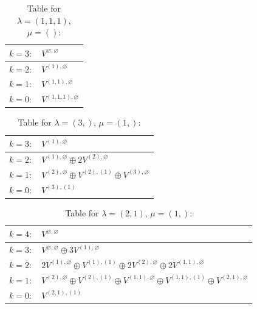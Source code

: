\documentclass[a4paper,12pt]{article}
\begin{document}
\renewcommand{\arraystretch}{1.6} 
\begin{table}[H]
\centering
\caption{Table for $\lambda = (1, 1, 1)$, $\mu = ()$:}
\begin{tabular}{|>{\centering\arraybackslash}p{15cm}|}
\hline
 $k = 3: \quad V^{\varnothing, \varnothing} $ \\ \hline
 $k = 2: \quad V^{(1), \varnothing} $ \\ \hline
 $k = 1: \quad V^{(1, 1), \varnothing} $ \\ \hline
 $k = 0: \quad V^{(1, 1, 1), \varnothing} $ \\ \hline
\end{tabular}
\end{table}

\renewcommand{\arraystretch}{1.6} 
\begin{table}[H]
\centering
\caption{Table for $\lambda = (3,)$, $\mu = (1,)$:}
\begin{tabular}{|>{\centering\arraybackslash}p{15cm}|}
\hline
 $k = 3: \quad V^{(1), \varnothing} $ \\ \hline
 $k = 2: \quad V^{(1), \varnothing} \oplus 2 V^{(2), \varnothing} $ \\ \hline
 $k = 1: \quad V^{(2), \varnothing} \oplus V^{(2), (1)} \oplus V^{(3), \varnothing} $ \\ \hline
 $k = 0: \quad V^{(3), (1)} $ \\ \hline
\end{tabular}
\end{table}

\renewcommand{\arraystretch}{1.6} 
\begin{table}[H]
\centering
\caption{Table for $\lambda = (2, 1)$, $\mu = (1,)$:}
\begin{tabular}{|>{\centering\arraybackslash}p{15cm}|}
\hline
 $k = 4: \quad V^{\varnothing, \varnothing} $ \\ \hline
 $k = 3: \quad V^{\varnothing, \varnothing} \oplus 3 V^{(1), \varnothing} $ \\ \hline
 $k = 2: \quad 2 V^{(1), \varnothing} \oplus V^{(1), (1)} \oplus 2 V^{(2), \varnothing} \oplus 2 V^{(1, 1), \varnothing} $ \\ \hline
 $k = 1: \quad V^{(2), \varnothing} \oplus V^{(2), (1)} \oplus V^{(1, 1), \varnothing} \oplus V^{(1, 1), (1)} \oplus V^{(2, 1), \varnothing} $ \\ \hline
 $k = 0: \quad V^{(2, 1), (1)} $ \\ \hline
\end{tabular}
\end{table}
\end{document}
